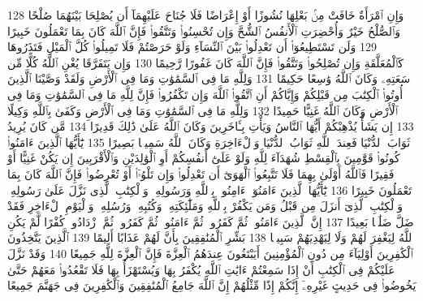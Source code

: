 {\tiny\colorbox{cl_aya}{128}} وَإِنِ ٱمْرَأَةٌ خَافَتْ مِنۢ بَعْلِهَا نُشُوزًا أَوْ إِعْرَاضًا فَلَا جُنَاحَ عَلَيْهِمَآ أَن يُصْلِحَا بَيْنَهُمَا صُلْحًا وَٱلصُّلْحُ خَيْرٌ وَأُحْضِرَتِ ٱلْأَنفُسُ ٱلشُّحَّ وَإِن تُحْسِنُوا۟ وَتَتَّقُوا۟ فَإِنَّ ٱللَّهَ كَانَ بِمَا تَعْمَلُونَ خَبِيرًا
{\tiny\colorbox{cl_aya}{129}} وَلَن تَسْتَطِيعُوٓا۟ أَن تَعْدِلُوا۟ بَيْنَ ٱلنِّسَآءِ وَلَوْ حَرَصْتُمْ فَلَا تَمِيلُوا۟ كُلَّ ٱلْمَيْلِ فَتَذَرُوهَا كَٱلْمُعَلَّقَةِ وَإِن تُصْلِحُوا۟ وَتَتَّقُوا۟ فَإِنَّ ٱللَّهَ كَانَ غَفُورًا رَّحِيمًا
{\tiny\colorbox{cl_aya}{130}} وَإِن يَتَفَرَّقَا يُغْنِ ٱللَّهُ كُلًّا مِّن سَعَتِهِۦ وَكَانَ ٱللَّهُ وَٰسِعًا حَكِيمًا
{\tiny\colorbox{cl_aya}{131}} وَلِلَّهِ مَا فِى ٱلسَّمَٰوَٰتِ وَمَا فِى ٱلْأَرْضِ وَلَقَدْ وَصَّيْنَا ٱلَّذِينَ أُوتُوا۟ ٱلْكِتَٰبَ مِن قَبْلِكُمْ وَإِيَّاكُمْ أَنِ ٱتَّقُوا۟ ٱللَّهَ وَإِن تَكْفُرُوا۟ فَإِنَّ لِلَّهِ مَا فِى ٱلسَّمَٰوَٰتِ وَمَا فِى ٱلْأَرْضِ وَكَانَ ٱللَّهُ غَنِيًّا حَمِيدًا
{\tiny\colorbox{cl_aya}{132}} وَلِلَّهِ مَا فِى ٱلسَّمَٰوَٰتِ وَمَا فِى ٱلْأَرْضِ وَكَفَىٰ بِٱللَّهِ وَكِيلًا
{\tiny\colorbox{cl_aya}{133}} إِن يَشَأْ يُذْهِبْكُمْ أَيُّهَا ٱلنَّاسُ وَيَأْتِ بِـَٔاخَرِينَ وَكَانَ ٱللَّهُ عَلَىٰ ذَٰلِكَ قَدِيرًا
{\tiny\colorbox{cl_aya}{134}} مَّن كَانَ يُرِيدُ ثَوَابَ ٱلدُّنْيَا فَعِندَ ٱللَّهِ ثَوَابُ ٱلدُّنْيَا وَٱلْءَاخِرَةِ وَكَانَ ٱللَّهُ سَمِيعًۢا بَصِيرًا
{\tiny\colorbox{cl_aya}{135}} يَٰٓأَيُّهَا ٱلَّذِينَ ءَامَنُوا۟ كُونُوا۟ قَوَّٰمِينَ بِٱلْقِسْطِ شُهَدَآءَ لِلَّهِ وَلَوْ عَلَىٰٓ أَنفُسِكُمْ أَوِ ٱلْوَٰلِدَيْنِ وَٱلْأَقْرَبِينَ إِن يَكُنْ غَنِيًّا أَوْ فَقِيرًا فَٱللَّهُ أَوْلَىٰ بِهِمَا فَلَا تَتَّبِعُوا۟ ٱلْهَوَىٰٓ أَن تَعْدِلُوا۟ وَإِن تَلْوُۥٓا۟ أَوْ تُعْرِضُوا۟ فَإِنَّ ٱللَّهَ كَانَ بِمَا تَعْمَلُونَ خَبِيرًا
{\tiny\colorbox{cl_aya}{136}} يَٰٓأَيُّهَا ٱلَّذِينَ ءَامَنُوٓا۟ ءَامِنُوا۟ بِٱللَّهِ وَرَسُولِهِۦ وَٱلْكِتَٰبِ ٱلَّذِى نَزَّلَ عَلَىٰ رَسُولِهِۦ وَٱلْكِتَٰبِ ٱلَّذِىٓ أَنزَلَ مِن قَبْلُ وَمَن يَكْفُرْ بِٱللَّهِ وَمَلَٰٓئِكَتِهِۦ وَكُتُبِهِۦ وَرُسُلِهِۦ وَٱلْيَوْمِ ٱلْءَاخِرِ فَقَدْ ضَلَّ ضَلَٰلًۢا بَعِيدًا
{\tiny\colorbox{cl_aya}{137}} إِنَّ ٱلَّذِينَ ءَامَنُوا۟ ثُمَّ كَفَرُوا۟ ثُمَّ ءَامَنُوا۟ ثُمَّ كَفَرُوا۟ ثُمَّ ٱزْدَادُوا۟ كُفْرًا لَّمْ يَكُنِ ٱللَّهُ لِيَغْفِرَ لَهُمْ وَلَا لِيَهْدِيَهُمْ سَبِيلًۢا
{\tiny\colorbox{cl_aya}{138}} بَشِّرِ ٱلْمُنَٰفِقِينَ بِأَنَّ لَهُمْ عَذَابًا أَلِيمًا
{\tiny\colorbox{cl_aya}{139}} ٱلَّذِينَ يَتَّخِذُونَ ٱلْكَٰفِرِينَ أَوْلِيَآءَ مِن دُونِ ٱلْمُؤْمِنِينَ أَيَبْتَغُونَ عِندَهُمُ ٱلْعِزَّةَ فَإِنَّ ٱلْعِزَّةَ لِلَّهِ جَمِيعًا
{\tiny\colorbox{cl_aya}{140}} وَقَدْ نَزَّلَ عَلَيْكُمْ فِى ٱلْكِتَٰبِ أَنْ إِذَا سَمِعْتُمْ ءَايَٰتِ ٱللَّهِ يُكْفَرُ بِهَا وَيُسْتَهْزَأُ بِهَا فَلَا تَقْعُدُوا۟ مَعَهُمْ حَتَّىٰ يَخُوضُوا۟ فِى حَدِيثٍ غَيْرِهِۦٓ إِنَّكُمْ إِذًا مِّثْلُهُمْ إِنَّ ٱللَّهَ جَامِعُ ٱلْمُنَٰفِقِينَ وَٱلْكَٰفِرِينَ فِى جَهَنَّمَ جَمِيعًا
